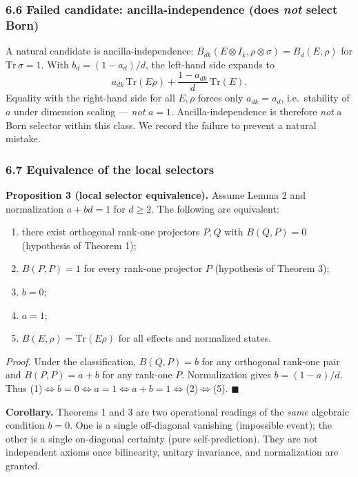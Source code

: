 \documentclass[
]{article}
\providecommand{\tightlist}{%
  \setlength{\itemsep}{0pt}\setlength{\parskip}{0pt}}
\begin{document}
\subsubsection{\texorpdfstring{6.6 Failed candidate:
ancilla-independence (does \emph{not} select
Born)}{6.6 Failed candidate: ancilla-independence (does not select Born)}}\label{failed-candidate-ancilla-independence-does-not-select-born}

A natural candidate is ancilla-independence:
\(B_{dk}(E\otimes I_k,\rho\otimes\sigma)=B_d(E,\rho)\) for
\(\mathrm{Tr}\,\sigma=1\). With \(b_d=(1-a_d)/d\), the left-hand side
expands to
\[a_{dk}\,\mathrm{Tr}(E\rho)+\frac{1-a_{dk}}{d}\,\mathrm{Tr}(E).\]
Equality with the right-hand side for all \(E,\rho\) forces only
\(a_{dk}=a_d\), i.e.~stability of \(a\) under dimension scaling ---
\emph{not} \(a=1\). Ancilla-independence is therefore \emph{not} a Born
selector within this class. We record the failure to prevent a natural
mistake.

\subsubsection{6.7 Equivalence of the local
selectors}\label{equivalence-of-the-local-selectors}

\textbf{Proposition 3 (local selector equivalence).} Assume Lemma 2 and
normalization \(a+bd=1\) for \(d\geq 2\). The following are equivalent:

\begin{enumerate}
\def\labelenumi{\arabic{enumi}.}
\tightlist
\item
  there exist orthogonal rank-one projectors \(P,Q\) with \(B(Q,P)=0\)
  (hypothesis of Theorem 1);
\item
  \(B(P,P)=1\) for every rank-one projector \(P\) (hypothesis of Theorem
  3);
\item
  \(b=0\);
\item
  \(a=1\);
\item
  \(B(E,\rho)=\mathrm{Tr}(E\rho)\) for all effects and normalized
  states.
\end{enumerate}

\emph{Proof.} Under the classification, \(B(Q,P)=b\) for any orthogonal
rank-one pair and \(B(P,P)=a+b\) for any rank-one \(P\). Normalization
gives \(b=(1-a)/d\). Thus
(1)\(\Leftrightarrow b=0\Leftrightarrow a=1\Leftrightarrow a+b=1\Leftrightarrow\)(2)\(\Leftrightarrow\)(5).
\(\blacksquare\)

\textbf{Corollary.} Theorems 1 and 3 are two operational readings of the
\emph{same} algebraic condition \(b=0\). One is a single off-diagonal
vanishing (impossible event); the other is a single on-diagonal
certainty (pure self-prediction). They are not independent axioms once
bilinearity, unitary invariance, and normalization are granted.
\end{document}
